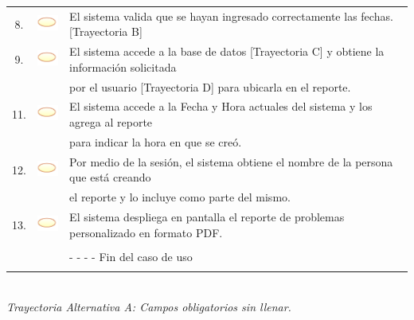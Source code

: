 \documentclass[10pt,spanish]{article}
\providecommand{\tabularnewline}{\\}
\begin{document}
\begin{tabular}{ccl}
	8. & \includegraphics{sistema} & El sistema valida que se hayan ingresado correctamente las fechas. [Trayectoria B] \tabularnewline	

    9. & \includegraphics{sistema} & El sistema accede a la base de datos [Trayectoria C] y obtiene la información solicitada \tabularnewline
    & & por el usuario [Trayectoria D] para ubicarla en el reporte.   \tabularnewline
	
	11. & \includegraphics{sistema} & El sistema accede a la Fecha y Hora actuales del sistema y los agrega al reporte     \tabularnewline
	& &  para indicar la hora en que se creó.\tabularnewline
	
	12. & \includegraphics{sistema} & Por medio de la sesión, el sistema obtiene el nombre de la persona que está creando       \tabularnewline
	& &  el reporte y lo incluye como parte del mismo.\tabularnewline

    13. & \includegraphics{sistema} & El sistema despliega en pantalla el reporte de problemas personalizado en formato PDF.       \tabularnewline
	
	\tabularnewline
	 &  & - - - - Fin del caso de uso\tabularnewline \\
	\end{tabular}

\newpage
	\textit{\large \\Trayectoria Alternativa A: Campos obligatorios sin llenar.}
	
\end{document}
